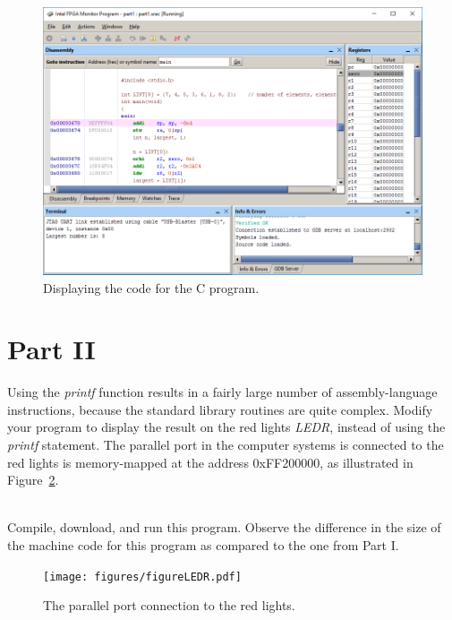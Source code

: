 \documentclass[epsfig,10pt,fullpage]{article}
\begin{document}
\begin{figure}[H]
	\begin{center}
	\includegraphics[scale=0.58]{figures/figureMP_goto.png}
	\end{center}
	\caption{Displaying the code for the C program.}
\label{fig:MPgoto}
\end{figure}

\section*{Part II}
Using the {\it printf} function results in a fairly large number of assembly-language instructions,
because the standard library routines are quite complex. Modify your program to display the 
result on the red lights {\it LEDR}, instead of using the {\it printf} statement. The
parallel port in the computer systems is connected to the red lights is memory-mapped at the 
address {\sf 0xFF200000}, as illustrated in Figure~\ref{fig:LEDR}.

~\\
Compile, download, and run this program. Observe the difference in the size of the
machine code for this program as compared to the one from Part I.

\begin{figure}[H]
	\begin{center}
	\texttt{[image: figures/figureLEDR.pdf]}
	\end{center}
	\caption{The parallel port connection to the red lights.}
\label{fig:LEDR}
\end{figure}
\end{document}
